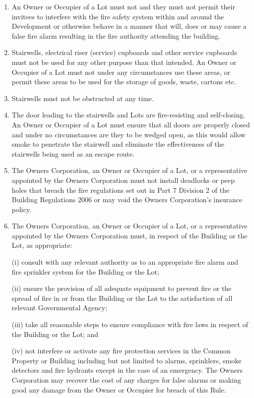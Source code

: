 \documentclass{article}
\begin{document}
\begin{enumerate}[label=\arabic*.]
\begin{enumerate}[label=\arabic{enumi}.\arabic*.]
\begin{enumerate}[label=(\arabic*)]
\begin{enumerate}[label=(\alph*)]
\item  An Owner or Occupier of a Lot must not and they must not permit their invitees to interfere with the fire safety system within and around the Development or otherwise behave in a manner that will, does or may cause a false fire alarm resulting in the fire authority attending the building.
\newpage


\item  Stairwells, electrical riser (service) cupboards and other service cupboards must not be used for any other purpose than that intended. An Owner or Occupier of a Lot must not under any circumstances use these areas, or permit these areas to be used for the storage of goods, waste, cartons etc.

\item  Stairwells must not be obstructed at any time.

\item  The door leading to the stairwells and Lots are fire-resisting and self-closing. An Owner or Occupier of a Lot must ensure that all doors are properly closed and under no circumstances are they to be wedged open, as this would allow smoke to penetrate the stairwell and eliminate the effectiveness of the stairwells being used as an escape route.

\item  The Owners Corporation, an Owner or Occupier of a Lot, or a representative appointed by the Owners Corporation must not install deadlocks or peep holes that breach the fire regulations set out in Part 7 Division 2 of the Building Regulations 2006 or may void the Owners Corporation’s insurance policy.

\item  The Owners Corporation, an Owner or Occupier of a Lot, or a representative appointed by the Owners Corporation must, in respect of the Building or the Lot, as appropriate:

(i) consult with any relevant authority as to an appropriate fire alarm and fire sprinkler system for the Building or the Lot;

(ii) ensure the provision of all adequate equipment to prevent fire or the spread of fire in or from the Building or the Lot to the satisfaction of all relevant Governmental Agency;

(iii) take all reasonable steps to ensure compliance with fire laws in respect of the Building or the Lot; and

(iv) not interfere or activate any fire protection services in the Common Property or Building including but not limited to alarms, sprinklers, smoke detectors and fire hydrants except in the case of an emergency. The Owners Corporation may recover the cost of any charges for false alarms or making good any damage from the Owner or Occupier for breach of this Rule.


\end{enumerate}
\end{enumerate}
\end{enumerate}
\end{enumerate}
\end{document}
